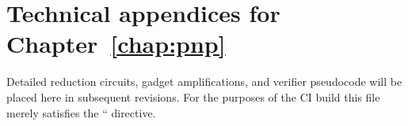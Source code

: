 \section{Technical appendices for Chapter~\ref{chap:pnp}}

Detailed reduction circuits, gadget amplifications, and verifier pseudocode
will be placed here in subsequent revisions.  For the purposes of the CI
build this file merely satisfies the `` directive. 